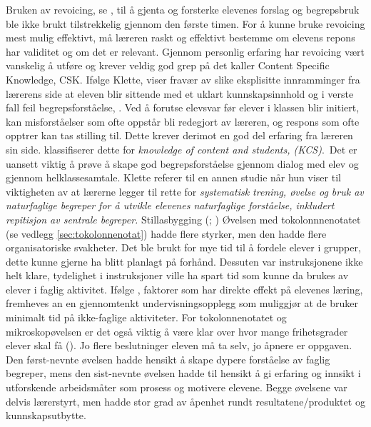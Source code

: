 \documentclass[main.tex]{subfiles}
\begin{document}
Bruken av revoicing, se , til å gjenta og forsterke elevenes forslag og begrepsbruk ble ikke brukt tilstrekkelig gjennom den første timen.
For å kunne bruke revoicing mest mulig effektivt, må læreren raskt og effektivt bestemme om elevens repons har validitet og om det er relevant.
Gjennom personlig erfaring har revoicing vært vanskelig å utføre og krever veldig god grep på det  kaller Content Specific Knowledge, CSK.
Ifølge Klette, viser fravær av slike eksplisitte innramminger fra lærerens side at eleven blir sittende med et uklart kunnskapsinnhold og i verste fall feil
begrepsforståelse, . Ved å forutse elevsvar før elever i klassen blir initiert, kan misforståelser som ofte oppstår bli redegjort
av læreren, og respons som ofte opptrer kan tas stilling til. Dette krever derimot en god del erfaring fra læreren sin side.  klassifiserer 
dette for \emph{knowledge of content and students, (KCS)}. Det er uansett viktig å prøve å skape god begrepsforståelse gjennom dialog med elev og gjennom helklassesamtale. 
Klette referer til en annen studie  når hun viser til viktigheten av at lærerne legger til rette for \emph{systematisk trening, øvelse og 
bruk av naturfaglige begreper for å utvikle elevenes naturfaglige forståelse, inkludert repitisjon av sentrale begreper.}
\newline
\newline
Stillasbygging (; )
\newline
\newline
Øvelsen med tokolonnnenotatet (se vedlegg \ref{sec:tokolonnenotat}) hadde flere styrker, men den hadde flere organisatoriske svakheter. Det ble brukt for mye
tid til å fordele elever i grupper, dette kunne gjerne ha blitt planlagt på forhånd. Dessuten var instruksjonene ikke helt klare, tydelighet i instruksjoner
ville ha spart tid som kunne da brukes av elever i faglig aktivitet. Ifølge , faktorer som har direkte effekt på elevenes læring,
fremheves an en gjennomtenkt undervisningsopplegg som muliggjør at de bruker minimalt tid på ikke-faglige aktiviteter. For tokolonnenotatet og mikroskopøvelsen 
er det også viktig å være klar over hvor mange frihetsgrader elever skal få (). Jo flere beslutninger eleven må ta selv, jo åpnere er oppgaven. Den først-nevnte
øvelsen hadde hensikt å skape dypere forståelse av faglig begreper, mens den sist-nevnte øvelsen hadde til hensikt å gi erfaring og innsikt i utforskende
arbeidsmåter som prosess og motivere elevene. Begge øvelsene var delvis lærerstyrt, men hadde stor grad av åpenhet rundt resultatene/produktet og kunnskapsutbytte.
\end{document}
